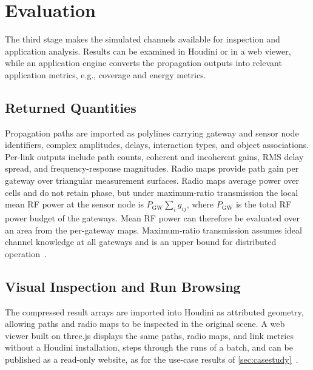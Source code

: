 \section{Evaluation}
\label{sec:evaluation}
The third stage makes the simulated channels available for inspection and application analysis. Results can be examined in Houdini or in a web viewer, while an application engine converts the propagation outputs into relevant application metrics, e.g., coverage and energy metrics. 

\subsection{Returned Quantities}
\label{sec:returned}
Propagation paths are imported as polylines carrying gateway and sensor node identifiers, complex amplitudes, delays, interaction types, and object associations. Per-link outputs include path counts, coherent and incoherent gains, RMS delay spread, and frequency-response magnitudes. Radio maps provide path gain per gateway over triangular measurement surfaces. Radio maps average power over cells and do not retain phase, but under maximum-ratio transmission the local mean RF power at the sensor node is $P_{\mathrm{GW}}\sum_i g_{ij}$, where $P_{\mathrm{GW}}$ is the total RF power budget of the gateways. Mean RF power can therefore be evaluated over an area from the per-gateway maps. Maximum-ratio transmission assumes ideal channel knowledge at all gateways and is an upper bound for distributed operation~\cite{callebaut2024}.


\subsection{Visual Inspection and Run Browsing}
\label{sec:inspection}
The compressed result arrays are imported into Houdini as attributed geometry, allowing paths and radio maps to be inspected in the original scene. A web viewer built on three.js displays the same paths, radio maps, and link metrics without a Houdini installation, steps through the runs of a batch, and can be published as a read-only website, as for the use-case results of \cref{sec:casestudy}~\cite{housionna}.

